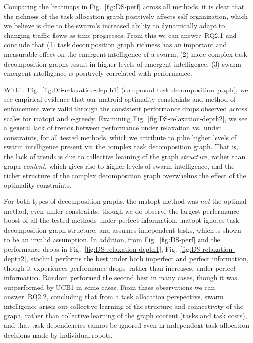 Comparing the heatmaps in Fig.~\ref{fig:DS-perf} across all methods, it is clear that
the richness of the task allocation graph positively affects self organization, which
we believe is due to the swarm's increased ability to dynamically adapt to changing
traffic flows as time progresses. From this we can answer~\gls{RQ2.1} and
conclude that (1) task decomposition graph richness has an important and measurable
effect on the emergent intelligence of a swarm, (2) more complex task decomposition
graphs result in higher levels of emergent intelligence, (3) swarm emergent
intelligence is positively correlated with performance.

Within Fig.~\ref{fig:DS-relaxation-depth1} (compound task decomposition graph), we
see empirical evidence that our matroid optimality constraints and method of
enforcement were valid through the consistent performance drops observed across
scales for \gls{matopt} and $\epsilon$-greedy. Examining
Fig.~\ref{fig:DS-relaxation-depth2}, we see a general lack of trends between
performance under relaxation vs.~under constraints, for all tested methods, which we
attribute to pthe higher levels of swarm intelligence present via the complex task
decomposition graph. That is, the lack of trends is due to collective learning of the
graph \emph{structure}, rather than graph \emph{content}, which gives rise to higher
levels of swarm intelligence, and the richer structure of the complex decomposition
graph overwhelms the effect of the optimality constraints.

For both types of decomposition graphs, the \gls{matopt} method was \emph{not}
the optimal method, even under constraints, though we do observe the largest
performance boost of all the tested methods under perfect
information. \gls{matopt} ignores task decomposition graph structure, and
assumes independent tasks, which is shown to be an invalid assumption. In
addition, from Fig.~\ref{fig:DS-perf} and the performance drops in
Fig.~\ref{fig:DS-relaxation-depth1}, Fig.~\ref{fig:DS-relaxation-depth2},
\gls{stochn1} performs the best under both imperfect and perfect information,
though it experiences performance drops, rather than increases, under perfect
information. Random performed the second best in many cases, though it was
outperformed by UCB1 in some cases. From these observations we can
answer~\gls{RQ2.2}, concluding that from a task allocation perspective, swarm
intelligence arises out collective learning of the structure and connectivity of
the graph, rather than collective learning of the graph content (tasks and task
costs), and that task dependencies cannot be ignored even in independent task
allocation decisions made by individual robots.

